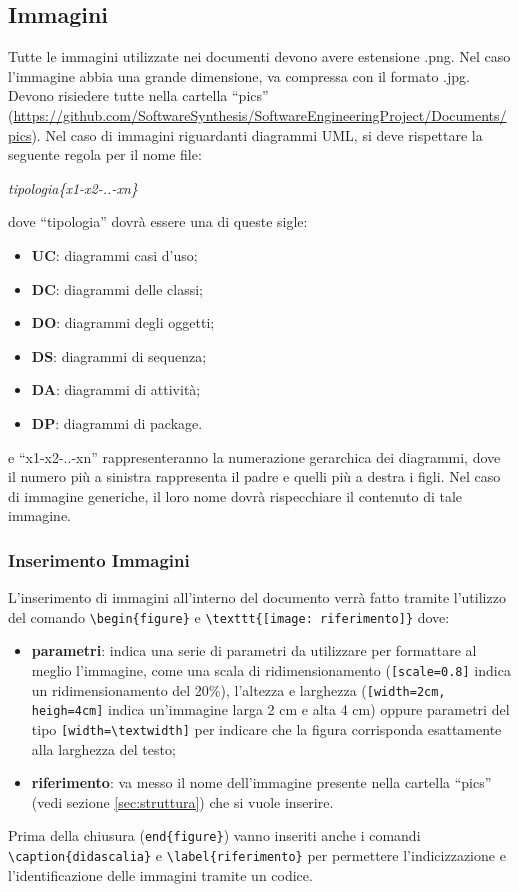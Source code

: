 \subsection{Immagini}
Tutte le immagini utilizzate nei documenti devono avere estensione .png. Nel caso l'immagine abbia una grande dimensione, va compressa con il formato .jpg. Devono risiedere tutte nella cartella ``pics'' (\url{https://github.com/SoftwareSynthesis/SoftwareEngineeringProject/Documents/pics}).
\newline
Nel caso di immagini riguardanti diagrammi UML, si deve rispettare la seguente regola per il nome file:
\begin{center}
\textit{tipologia\{x1-x2-..-xn\}}
\end{center}
dove ``tipologia'' dovrà essere una di queste sigle:
\begin{itemize}
\item \textbf{UC}: diagrammi casi d'uso;
\item \textbf{DC}: diagrammi delle classi;
\item \textbf{DO}: diagrammi degli oggetti;
\item \textbf{DS}: diagrammi di sequenza;
\item \textbf{DA}: diagrammi di attività;
\item \textbf{DP}: diagrammi di package.
\end{itemize}
e ``x1-x2-..-xn'' rappresenteranno la numerazione gerarchica dei diagrammi, dove il numero più a sinistra rappresenta il padre e quelli più a destra i figli.
\newline
Nel caso di immagine generiche, il loro nome dovrà rispecchiare il contenuto di tale immagine.

\subsubsection{Inserimento Immagini}
L'inserimento di immagini all'interno del documento verrà fatto tramite l'utilizzo del comando \verb+\begin{figure}+ e \verb+\texttt{[image: riferimento]}+ dove:
\begin{itemize}
\item \textbf{parametri}: indica una serie di parametri da utilizzare per formattare al meglio l'immagine, come una scala di ridimensionamento (\verb+[scale=0.8]+ indica un ridimensionamento del 20\%), l'altezza e larghezza (\verb+[width=2cm, heigh=4cm]+ indica un'immagine larga 2 cm e alta 4 cm) oppure parametri del tipo \verb+[width=\textwidth]+ per indicare che la figura corrisponda esattamente alla larghezza del testo;
\item \textbf{riferimento}: va messo il nome dell'immagine presente nella cartella ``pics'' (vedi sezione \ref{sec:struttura}) che si vuole inserire.
\end{itemize}
Prima della chiusura (\verb+end{figure}+) vanno inseriti anche i comandi \verb+\caption{didascalia}+ e \verb+\label{riferimento}+ per permettere l'indicizzazione e l'identificazione delle immagini tramite un codice.

